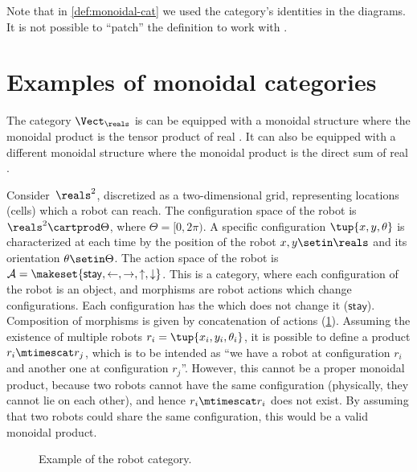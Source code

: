 \begin{remark}
    Note that in \cref{def:monoidal-cat} we used the category's identities in the diagrams.
    It is not possible to ``patch'' the definition to work with .
\end{remark}

\section{Examples of monoidal categories}



\begin{example}
    \label{ex:Vect-symmetric-monoidal}
    The category $\Vect_\reals$ is can be equipped with a monoidal structure where the monoidal product is the tensor product of real .
    It can also be equipped with a different monoidal structure where the monoidal product is the direct sum of real .
\end{example}

\begin{example}
    \label{ex:robot}
    Consider~$\reals^2$, discretized as a two-dim\-ensional grid, representing locations (cells) which a robot can reach.
    The configuration space of the robot is $\reals^2\cartprod \Theta$, where $\Theta=[0,2\pi)$.
    A specific configuration $\tup{x,y,\theta}$ is characterized at each time by the position of the robot $x,y\setin \reals$ and its orientation $\theta \setin \Theta$.
    The action space of the robot is $\mathcal{A}=\makeset{\mathsf{stay},\leftarrow, \rightarrow, \uparrow, \downarrow}$.
    This is a category, where each configuration of the robot is an object, and morphisms are robot actions which change configurations.
    Each configuration has the  which does not change it ($\mathsf{stay}$).
    Composition of morphisms is given by concatenation of actions (\cref{fig:robotcategory}).
    Assuming the existence of multiple robots $r_i=\tup{x_i,y_i,\theta_i}$, it is possible to define a product $r_i\mtimescat r_j$, which is to be intended as ``we have a robot at configuration $r_i$ and another one at configuration $r_j$''.
    However, this cannot be a proper monoidal product, because two robots cannot have the same configuration (physically, they cannot lie on each other), and hence $r_i\mtimescat r_i$ does not exist.
    By assuming that two robots could share the same configuration, this would be a valid monoidal product.
    \begin{figure}[tbh]
        \centering
        \caption{Example of the robot category. }
        \label{fig:robotcategory}
    \end{figure}
\end{example}


